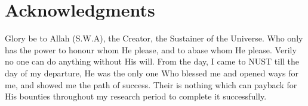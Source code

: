 
\chapter*{Acknowledgments}
Glory be to Allah (S.W.A), the Creator, the Sustainer of the Universe. Who only has the power to honour whom He please, and to abase whom He please. Verily no one can do anything without His will. From the day, I came to NUST till the day of my departure, He was the only one Who blessed me and opened ways for me, and showed me the path of success. Their is nothing which can payback for His bounties throughout my research period to complete it successfully.

\begin{flushright}
\textbf{\underline{\@author}}
\end{flushright}
